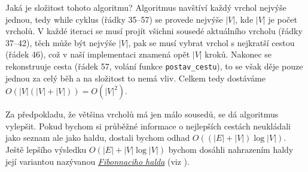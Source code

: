 
Jaká je složitost tohoto algoritmu? Algoritmus navštíví každý vrchol nejvýše jednou,
tedy while cyklus (řádky 35--57) se provede nejvýše $|V|$, kde $|V|$ je počet vrcholů.
V každé iteraci se musí projít všichni sousedé aktuálního vrcholu (řádky 37--42),
těch může být nejvýše $|V|$, pak se musí vybrat vrchol s nejkratší cestou (řádek 46),
což v naší implementaci znamená opět $|V|$ kroků. Nakonec se rekonstruuje cesta (řádek
57, volání funkce {\tt postav\_cestu}), to se však děje pouze jednou za celý běh a
na složitost to nemá vliv. Celkem tedy dostáváme $O(|V|(|V|+|V|)) = O(|V|^2)$.

Za předpokladu, že většina vrcholů má jen málo sousedů, se dá algoritmus vylepšit.
Pokud bychom si průběžné informace o nejlepších cestách neukládali jako seznam
ale jako haldu, dostali bychom odhad $O((|E|+|V|)\log|V|)$. Ještě lepšího výsledku
$O(|E| + |V|\log|V|)$ bychom dosáhli nahrazením haldy její variantou nazývanou \emph{\href{http://en.wikipedia.org/wiki/Fibonacci_heap}{Fibonnaciho halda}} (viz \cite{Tarjan:1984}).



\ifx\ucebnice\undefined

\fi
